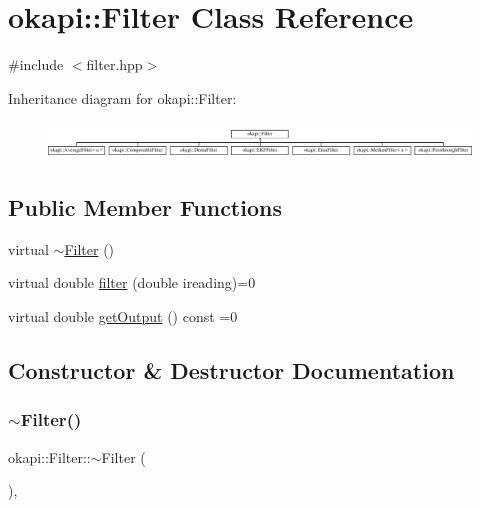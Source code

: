\hypertarget{classokapi_1_1Filter}{}\section{okapi\+::Filter Class Reference}
\label{classokapi_1_1Filter}


{\ttfamily \#include $<$filter.\+hpp$>$}

Inheritance diagram for okapi\+::Filter\+:\begin{figure}[H]
\begin{center}
\leavevmode
\includegraphics[height=0.969697cm]{classokapi_1_1Filter}
\end{center}
\end{figure}
\subsection*{Public Member Functions}
\begin{DoxyCompactItemize}
\item 
virtual \mbox{\hyperlink{classokapi_1_1Filter_a7391c913f315e28947bbfc3d8e29bef8}{$\sim$\+Filter}} ()
\item 
virtual double \mbox{\hyperlink{classokapi_1_1Filter_a7c2ea0b64b37b688900189856d58da15}{filter}} (double ireading)=0
\item 
virtual double \mbox{\hyperlink{classokapi_1_1Filter_a3469cd4bc108f8accf300d9f5cc9f42f}{get\+Output}} () const =0
\end{DoxyCompactItemize}


\subsection{Constructor \& Destructor Documentation}
\mbox{\label{classokapi_1_1Filter_a7391c913f315e28947bbfc3d8e29bef8}} 
\subsubsection{\texorpdfstring{$\sim$Filter()}{~Filter()}}
{\footnotesize\ttfamily okapi\+::\+Filter\+::$\sim$\+Filter (\begin{DoxyParamCaption}{ }\end{DoxyParamCaption})\hspace{0.3cm}{\ttfamily [virtual]}, {\ttfamily [default]}}



